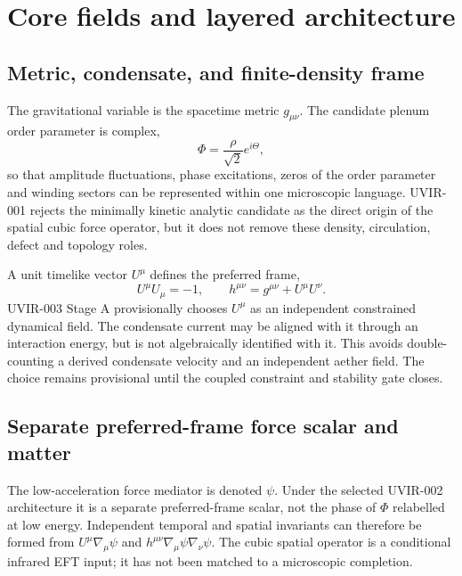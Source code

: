 \section{Core fields and layered architecture}

\subsection{Metric, condensate, and finite-density frame}

The gravitational variable is the spacetime metric $g_{\mu\nu}$.  The
candidate plenum order parameter is complex,
\begin{equation}
 \Phi=\frac{\rho}{\sqrt{2}}e^{i\Theta},
 \label{eq:complex-order}
\end{equation}
so that amplitude fluctuations, phase excitations, zeros of the order
parameter and winding sectors can be represented within one microscopic
language.  UVIR-001 rejects the minimally kinetic analytic candidate as the
direct origin of the spatial cubic force operator, but it does not remove
these density, circulation, defect and topology roles.

A unit timelike vector $U^\mu$ defines the preferred frame,
\begin{equation}
 U^\mu U_\mu=-1,
 \qquad
 h^{\mu\nu}=g^{\mu\nu}+U^\mu U^\nu.
 \label{eq:projector}
\end{equation}
UVIR-003 Stage A provisionally chooses $U^\mu$ as an independent constrained
dynamical field.  The condensate current may be aligned with it through an
interaction energy, but is not algebraically identified with it.  This avoids
double-counting a derived condensate velocity and an independent aether field.
The choice remains provisional until the coupled constraint and stability gate
closes.

\subsection{Separate preferred-frame force scalar and matter}

The low-acceleration force mediator is denoted $\psi$.  Under the selected
UVIR-002 architecture it is a separate preferred-frame scalar, not the phase
of $\Phi$ relabelled at low energy.  Independent temporal and spatial
invariants can therefore be formed from $U^\mu\nabla_\mu\psi$ and
$h^{\mu\nu}\nabla_\mu\psi\nabla_\nu\psi$.  The cubic spatial operator is a
conditional infrared EFT input; it has not been matched to a microscopic
completion.

